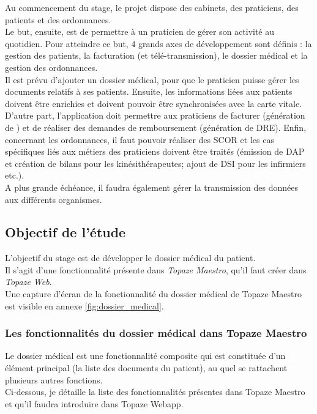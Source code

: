Au commencement du stage, le projet dispose des cabinets, des praticiens, des patients et des ordonnances.\\

Le but, ensuite, est de permettre à un praticien de gérer son activité au quotidien. Pour atteindre ce but, 4 grands axes de développement sont définis : la gestion des patients, la facturation (et télé-transmission), le dossier médical et la gestion des ordonnances.\\

Il est prévu d'ajouter un dossier médical, pour que le praticien puisse gérer les documents relatifs à ses patients. Ensuite, les informations liées aux patients doivent être enrichies et doivent pouvoir être synchronisées avec la carte vitale. D'autre part, l'application doit permettre aux praticiens de facturer (génération de ) et de réaliser des demandes de remboursement (génération de \gls{DRE}). Enfin, concernant les ordonnances, il faut pouvoir réaliser des \gls{SCOR} et les cas spécifiques liés aux métiers des praticiens doivent être traités (émission de \gls{DAP} et création de bilans pour les kinésithérapeutes; ajout de \gls{DSI} pour les infirmiers etc.). \\

A plus grande échéance, il faudra également gérer la transmission des données aux différents organismes.

\subsection{Objectif de l'étude}

L'objectif du stage est de développer le dossier médical du patient.\\ 
Il s'agit d'une fonctionnalité présente dans \textit{Topaze Maestro}, qu'il faut créer dans \textit{Topaze Web}.\\
Une capture d'écran de la fonctionnalité du dossier médical de Topaze Maestro est visible en annexe \ref{fig:dossier_medical}.


\subsubsection{Les fonctionnalités du dossier médical dans Topaze Maestro}
Le dossier médical est une fonctionnalité composite qui est constituée d'un élément principal (la liste des documents du patient), au quel se rattachent plusieurs autres fonctions.\\
Ci-dessous, je détaille la liste des fonctionnalités présentes dans Topaze Maestro et qu'il faudra introduire dans Topaze Webapp.

